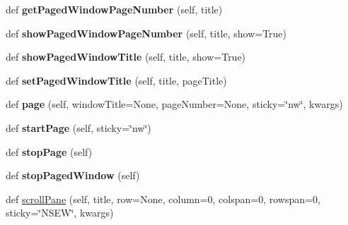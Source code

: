 \begin{DoxyCompactItemize}
\mbox{\label{class_python_01_g_u_i_1_1appjar_1_1gui_a305dc7222ef8d8b3b6f7a0dddf807d21}} 
def {\bfseries get\+Paged\+Window\+Page\+Number} (self, title)
\item 
\mbox{\label{class_python_01_g_u_i_1_1appjar_1_1gui_a65cd4b043bc4de4affce6f92be0b58ad}} 
def {\bfseries show\+Paged\+Window\+Page\+Number} (self, title, show=True)
\item 
\mbox{\label{class_python_01_g_u_i_1_1appjar_1_1gui_aa9a364aa7ed5f1d1f4da2501316d23b1}} 
def {\bfseries show\+Paged\+Window\+Title} (self, title, show=True)
\item 
\mbox{\label{class_python_01_g_u_i_1_1appjar_1_1gui_a16069d14f33a7e9f7c64a1dedbfc1a78}} 
def {\bfseries set\+Paged\+Window\+Title} (self, title, page\+Title)
\item 
\mbox{\label{class_python_01_g_u_i_1_1appjar_1_1gui_a523f5e6043c781ce7eac1bd49e8a5b2e}} 
def {\bfseries page} (self, window\+Title=None, page\+Number=None, sticky=\char`\"{}nw\char`\"{}, kwargs)
\item 
\mbox{\label{class_python_01_g_u_i_1_1appjar_1_1gui_a1d80cba4a02b2aad08bca0fb12883e0a}} 
def {\bfseries start\+Page} (self, sticky=\char`\"{}nw\char`\"{})
\item 
\mbox{\label{class_python_01_g_u_i_1_1appjar_1_1gui_af6dc6befea791a04fd186ab79d7ff999}} 
def {\bfseries stop\+Page} (self)
\item 
\mbox{\label{class_python_01_g_u_i_1_1appjar_1_1gui_abdd6147907fc578e65beb1ed5d72aae7}} 
def {\bfseries stop\+Paged\+Window} (self)
\item 
\mbox{\label{class_python_01_g_u_i_1_1appjar_1_1gui_ae5d84e838c89554da7aeb5c5ad9b82e5}} 
def \hyperlink{class_python_01_g_u_i_1_1appjar_1_1gui_ae5d84e838c89554da7aeb5c5ad9b82e5}{scroll\+Pane} (self, title, row=None, column=0, colspan=0, rowspan=0, sticky=\char`\"{}N\+S\+EW\char`\"{}, kwargs)

\end{DoxyCompactItemize}
